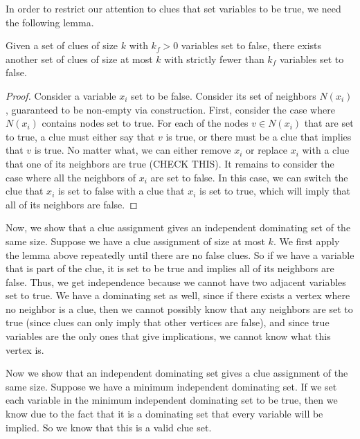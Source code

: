 \documentclass[runningheads,a4paper]{llncs}
\begin{document}
%

In order to restrict our attention to clues that set variables to be true, we need the following lemma.

\begin{lemma} Given a set of clues of size $k$ with $k_f > 0$ variables set to false, there exists another set of clues of size at most $k$ with strictly fewer than $k_f$ variables set to false.
\end{lemma}

\begin{proof} 
Consider a variable $x_i$ set to be false. Consider its set of neighbors $N(x_i)$, guaranteed to be non-empty via construction. First, consider the case where $N(x_i)$ contains nodes set to true. For each of the nodes $v \in N(x_i)$ that are set to true, a clue must either say that $v$ is true, or there must be a clue that implies that $v$ is true. No matter what, we can either remove $x_i$ or replace $x_i$ with a clue that one of its neighbors are true (CHECK THIS). It remains to consider the case where all the neighbors of $x_i$ are set to false. In this case, we can switch the clue that $x_i$ is set to false with a clue that $x_i$ is set to true, which will imply that all of its neighbors are false.
\end{proof}

Now, we show that a clue assignment gives an independent dominating set of the same size. Suppose we have a clue assignment of size at most $k$. We first apply the lemma above repeatedly until there are no false clues. So if we have a variable that is part of the clue, it is set to be true and implies all of its neighbors are false. Thus, we get independence because we cannot have two adjacent variables set to true. We have a dominating set as well, since if there exists a vertex where no neighbor is a clue, then we cannot possibly know that any neighbors are set to true (since clues can only imply that other vertices are false), and since true variables are the only ones that give implications, we cannot know what this vertex is. 

Now we show that an independent dominating set gives a clue assignment of the same size. Suppose we have a minimum independent dominating set. If we set each variable in the minimum independent dominating set to be true, then we know due to the fact that it is a dominating set that every variable will be implied. So we know that this is a valid clue set.
\end{document}
